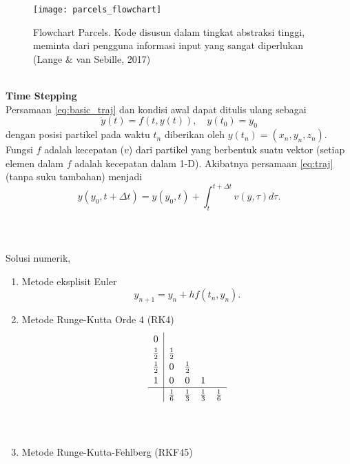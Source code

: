 \documentclass{beamer}
\begin{document}
\begin{frame}[allowframebreaks]
	\newpage
	$\;$ \\
	$\;$ \\
	\begin{figure}[H]
		\centering
		\texttt{[image: parcels\_flowchart]}
		\caption{Flowchart Parcels. Kode disusun dalam tingkat abstraksi tinggi, meminta
			dari pengguna informasi input yang sangat diperlukan (Lange \& van Sebille, 2017)}
		\label{fig:parcelsflowchart}
	\end{figure}
	\newpage
	$\;$ \\
	\textbf{\large Time Stepping} \\
	Persamaan \ref{eq:basic_traj} dan kondisi awal dapat ditulis ulang sebagai 
	\begin{equation}\label{eq:newbasic_traj}
		\dot y(t) = f(t,y(t)), \quad y(t_0)=y_0
	\end{equation}
	dengan posisi partikel pada waktu $t_n$ diberikan  oleh $y(t_n)=(x_n,y_n,z_n)$. Fungsi $f$ adalah kecepatan ($v$) dari partikel yang berbentuk suatu vektor (setiap elemen dalam $f$ adalah kecepatan dalam 1-D). Akibatnya persamaan \ref{eq:traj} (tanpa suku tambahan) menjadi
	\begin{equation}
		y(y_0,t+\Delta t) = y(y_0,t)+\int_{t}^{t+\Delta t}v(y,\tau)d\tau.
	\end{equation}
	$\;$ \\
	$\;$ \\
	$\;$ \\
	Solusi numerik,
	\begin{enumerate}
		\item Metode eksplisit Euler
		\begin{equation}
			y_{n+1}=y_n+hf(t_n,y_n).
		\end{equation}
		\item Metode Runge-Kutta Orde 4 (RK4)
		\[
		\renewcommand\arraystretch{1.2}
		\begin{array}
			{c|cccc}
			0\\
			\frac{1}{2} & \frac{1}{2}\\
			\frac{1}{2} &0 &\frac{1}{2} \\
			1& 0& 0& 1\\
			\hline
			& \frac{1}{6} &\frac{1}{3} &\frac{1}{3} &\frac{1}{6} 
		\end{array}
		\]
		$\;$ \\
		$\;$ \\
		\item Metode Runge-Kutta-Fehlberg (RKF45)
		\[
		\renewcommand\arraystretch{1.2}
		\begin{array}
			{c|cccccc}

\end{array}\]
\end{enumerate}
\end{frame}
\end{document}
